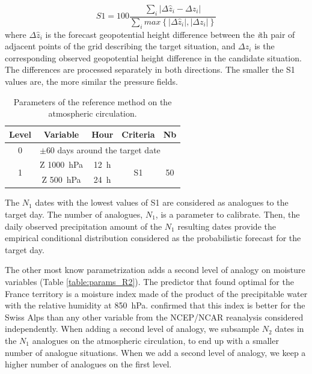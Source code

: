 \documentclass[5p]{elsarticle}
\begin{document}
\begin{equation}
\label{eq:S1}
S1=100 \frac {\displaystyle \sum_{i} \vert \Delta\hat{z}_{i} - \Delta z_{i} \vert}
{\displaystyle \sum_{i} max\left\lbrace \vert \Delta\hat{z}_{i} \vert , \vert \Delta z_{i} \vert \right\rbrace }
\end{equation}
where $\Delta \hat{z}_{i}$ is the forecast geopotential height difference between the \textit{i}th pair of adjacent points of the grid describing the target situation, and $\Delta z_{i}$ is the corresponding observed geopotential height difference in the candidate situation. The differences are processed separately in both directions. The smaller the S1 values are, the more similar the pressure fields.


\begin{table}[htbp]
	\caption{Parameters of the reference method on the atmospheric circulation.}
	\footnotesize
	\begin{center}
		\begin{tabular}{ccccc}
			\hline
			Level & Variable & Hour & Criteria & Nb \\ 
			\hline 
			0 & \multicolumn{4}{l}{$\pm 60$ days around the target date} \\
			\hline 
			\multirow{2}{*}{1} & Z 1000~hPa & 12~h & \multirow{2}{*}{S1} & \multirow{2}{*}{50} \\
			& Z 500~hPa & 24~h & & \\ 
			\hline 
		\end{tabular} 
	\end{center}
	\label{table:params_R1}
\end{table}

The $N_{1}$ dates with the lowest values of S1 are considered as analogues to the target day. The number of analogues, $N_{1}$, is a parameter to calibrate. Then, the daily observed precipitation amount of the $N_{1}$ resulting dates provide the empirical conditional distribution considered as the probabilistic forecast for the target day.

The other most know parametrization adds a second level of analogy on moisture variables (Table \ref{table:params_R2}). The predictor that \citet{Bontron2004} found optimal for the France territory is a moisture index made of the product of the precipitable water with the relative humidity at 850~hPa. \cite{Horton2012a} confirmed that this index is better for the Swiss Alps than any other variable from the NCEP/NCAR reanalysis considered independently. When adding a second level of analogy, we subsample $N_{2}$ dates in the $N_{1}$ analogues on the atmospheric circulation, to end up with a smaller number of analogue situations. When we add a second level of analogy, we keep a higher number of analogues on the first level.
\end{document}
